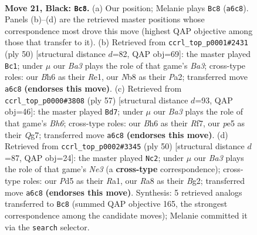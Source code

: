 \documentclass[11pt]{article}
\begin{document}
\clearpage

\begin{figure}[p]\centering
\begin{subfigure}{0.46\textwidth}\centering
\resizebox{\linewidth}{!}{%
\newchessgame
\chessboard[
  setfen={rn1qk3/p7/b1p1p1pb/P1PpP3/1P3P2/2P2N2/8/R1BQK1N1 b Qq - 1 21},
  showmover=false,
  pgfstyle=straightmove, color=movearrow, markmove={a6-c8}
]}
\caption{}
\end{subfigure}\hfill
\begin{subfigure}{0.46\textwidth}\centering
\resizebox{\linewidth}{!}{%
\newchessgame
\chessboard[
  setfen={1r1q2k1/ppn1npbp/2p3p1/2P5/2BP2P1/B4N1P/P4P2/1Q2R1K1 w - - 5 26},
  showmover=false,
  pgfstyle=straightmove, color=movearrow, markmove={a3-c1}
]}
\caption{}
\end{subfigure}
\\[4pt]
\begin{subfigure}{0.46\textwidth}\centering
\resizebox{\linewidth}{!}{%
\newchessgame
\chessboard[
  setfen={7k/1pp2rq1/2np3p/p5p1/2P2P2/1P3BPb/P2QN2P/3R2K1 b - - 5 29},
  showmover=false,
  pgfstyle=straightmove, color=movearrow, markmove={h3-d7}
]}
\caption{}
\end{subfigure}\hfill
\begin{subfigure}{0.46\textwidth}\centering
\resizebox{\linewidth}{!}{%
\newchessgame
\chessboard[
  setfen={1nr3k1/3q1p2/3bp1p1/7p/1p1P3P/1PpQN1P1/4PPB1/R5K1 w - - 0 26},
  showmover=false,
  pgfstyle=straightmove, color=movearrow, markmove={e3-c2}
]}
\caption{}
\end{subfigure}
\caption{\textbf{Move 21, Black: \texttt{Bc8}.} (a) Our position; Melanie plays \texttt{Bc8} (\texttt{a6c8}). Panels (b)--(d) are the retrieved master positions whose correspondence most drove this move (highest QAP objective among those that transfer to it). (b) Retrieved from \texttt{ccrl\_top\_p0001\#2431} (ply 50) [structural distance $d$=82, QAP obj=69]: the master played \texttt{Bc1}; under $\mu$ our \emph{Ba3} plays the role of that game's \emph{Ba3}; cross-type roles: our \emph{B}h6 as their \emph{R}e1, our \emph{N}b8 as their \emph{P}a2; transferred move \texttt{a6c8} \textbf{(endorses this move)}. (c) Retrieved from \texttt{ccrl\_top\_p0000\#3808} (ply 57) [structural distance $d$=93, QAP obj=46]: the master played \texttt{Bd7}; under $\mu$ our \emph{Ba3} plays the role of that game's \emph{Bh6}; cross-type roles: our \emph{B}h6 as their \emph{R}f7, our \emph{p}e5 as their \emph{Q}g7; transferred move \texttt{a6c8} \textbf{(endorses this move)}. (d) Retrieved from \texttt{ccrl\_top\_p0002\#3345} (ply 50) [structural distance $d$=87, QAP obj=24]: the master played \texttt{Nc2}; under $\mu$ our \emph{Ba3} plays the role of that game's \emph{Ne3} (a \textbf{cross-type} correspondence); cross-type roles: our \emph{P}d5 as their \emph{R}a1, our \emph{R}a8 as their \emph{B}g2; transferred move \texttt{a6c8} \textbf{(endorses this move)}. Synthesis: 5 retrieved analogs transferred to \texttt{Bc8} (summed QAP objective 165, the strongest correspondence among the candidate moves); Melanie committed it via the \texttt{search} selector.}
\label{fig:thought-m41}
\end{figure}
\end{document}
